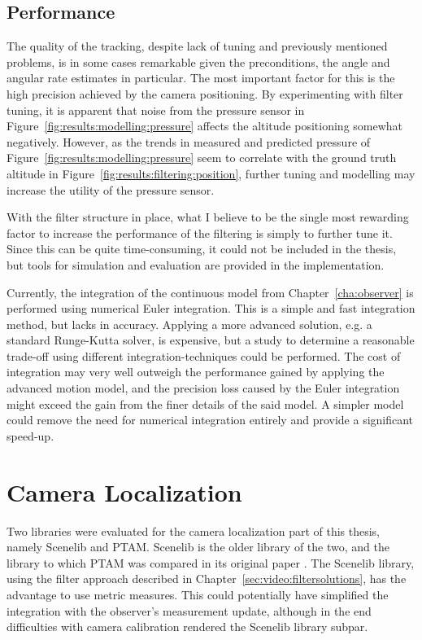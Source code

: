         \subsection{Performance}
            The quality of the tracking, despite lack of tuning and previously
            mentioned problems, is in some cases remarkable given the
            preconditions, the angle and angular rate estimates in particular.
            The most important factor for this is the high precision achieved by the
            camera positioning. By experimenting with filter tuning, it
            is apparent that noise from the pressure sensor
            in Figure~\ref{fig:results:modelling:pressure} affects the altitude positioning
            somewhat negatively. However, as the trends in measured and predicted pressure of Figure~\ref{fig:results:modelling:pressure}
            seem to correlate with the ground truth altitude in Figure~\ref{fig:results:filtering:position},
            further tuning and modelling may increase the utility of the pressure sensor.

            With the filter structure in place, what I believe to be the single
            most rewarding factor to increase the performance of the filtering
            is simply to further tune it. Since this can be quite time-consuming,
            it could not be included in the thesis, but tools for simulation
            and evaluation are provided in the implementation.

            Currently, the integration of the continuous model from Chapter~\ref{cha:observer}
            is performed using numerical Euler integration.
            This is a simple and fast integration method, but lacks in accuracy.
            Applying a more advanced solution, e.g. a standard Runge-Kutta solver,
            is expensive, but a study to determine a reasonable trade-off
            using different integration-techniques could be performed.
            The cost of integration may very well outweigh
            the performance gained by applying the advanced motion model,
            and the precision loss caused by the Euler integration might
            exceed the gain from the finer details of the said model.
            A simpler model could remove the need for numerical integration
            entirely and provide a significant speed-up.

    \section{Camera Localization}
        Two libraries were evaluated for the camera localization part of this thesis,
        namely Scenelib and PTAM. Scenelib is the older library of the two,
        and the library to which PTAM was compared in its original paper \citep{klein07parallel}.
        The Scenelib library, using the filter approach described in Chapter~\ref{sec:video:filtersolutions},
        has the advantage to use metric measures.
        This could potentially have simplified the integration with the
        observer's measurement update, although in the end difficulties
        with camera calibration rendered the Scenelib library subpar.

